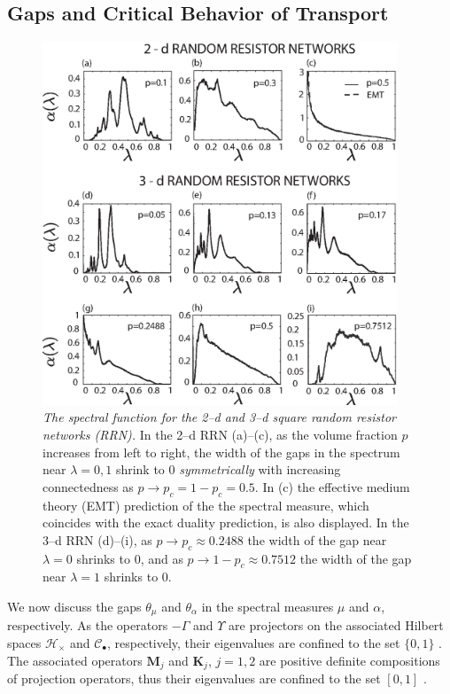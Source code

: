 \documentclass[english,12pt,jmp,graphicx]{revtex4-1}
\begin{document}
\subsection{Gaps and Critical Behavior of
  Transport} \label{sec:Spectral_Gap}   
%
%
\begin{figure}
\includegraphics[width=25pc]{2-3-d_Random_Resistor_Networks.eps}
\caption{\emph{The spectral function for the 2--d and 3--d square
    random resistor networks (RRN).} In the 2--d RRN (a)--(c), as the
  volume fraction $p$ increases from left to right,
  the width of the gaps in the spectrum near $\lambda=0,1$ shrink to 0
  \emph{symmetrically} with increasing connectedness as
  $p\to p_c=1-p_c=0.5$. In (c) the effective medium theory (EMT)  
  prediction of the the spectral measure, which coincides with the
  exact duality prediction, is also displayed. In
  the 3--d RRN (d)--(i), as $p\to p_c\approx0.2488$ the width of the gap near
  $\lambda=0$ shrinks to 0, and as $p\to1-p_c\approx0.7512$ the width of the gap
  near $\lambda=1$ shrinks to 0.}
\end{figure} \label{fig:2D-RBN}
%

We now discuss the gaps $\theta_\mu$ and $\theta_\alpha$ in the spectral measures $\mu$
and $\alpha$, respectively. As
the operators $-\Gamma$ and $\Upsilon$ are projectors on the associated Hilbert
spaces $\mathscr{H}_\times$ and $\mathscr{C}_\bullet$, 
respectively, their eigenvalues are confined to the set $\{0,1\}$
\cite{Reed-1980}. The associated operators $\mathbf{M}_j$ and $\mathbf{K}_j$,
$j=1,2$ are positive definite compositions of projection operators,
thus their eigenvalues are confined to the set $[0,1]$
\cite{Golden:CMP-467}. 
\end{document}
